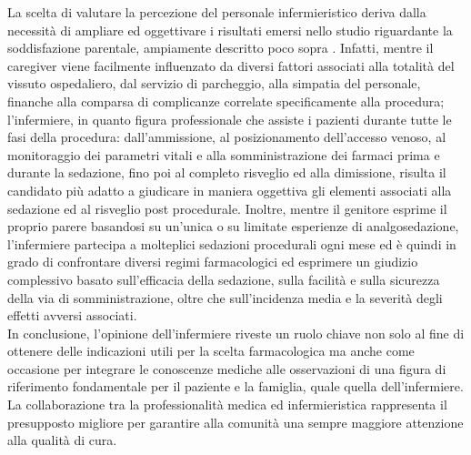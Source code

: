 La scelta di valutare la percezione del personale infermieristico deriva dalla necessità di ampliare ed oggettivare i risultati emersi nello studio riguardante la soddisfazione parentale, ampiamente descritto poco sopra \cite{Cortellazzo2022}. Infatti, mentre il caregiver viene facilmente influenzato da diversi fattori associati alla totalità del vissuto ospedaliero, dal servizio di parcheggio, alla simpatia del personale, finanche alla comparsa di complicanze correlate specificamente alla procedura; l'infermiere, in quanto figura professionale che assiste i pazienti durante tutte le fasi della procedura: dall'ammissione, al posizionamento dell'accesso venoso, al monitoraggio dei parametri vitali e alla somministrazione dei farmaci prima e durante la sedazione, fino poi al completo risveglio ed alla dimissione, risulta il candidato più adatto a giudicare in maniera oggettiva gli elementi associati alla sedazione ed al risveglio post procedurale. Inoltre, mentre il genitore esprime il proprio parere basandosi su un'unica o su limitate esperienze di analgosedazione, l'infermiere partecipa a molteplici sedazioni procedurali ogni mese ed è quindi in grado di confrontare diversi regimi farmacologici ed esprimere un giudizio complessivo basato sull'efficacia della sedazione, sulla facilità e sulla sicurezza della via di somministrazione, oltre che sull'incidenza media e la severità degli effetti avversi associati.
\\In conclusione, l'opinione dell'infermiere riveste un ruolo chiave non solo al fine di ottenere delle indicazioni utili per la scelta farmacologica ma anche come occasione per integrare le conoscenze mediche alle osservazioni di una figura di riferimento fondamentale per il paziente e la famiglia, quale quella dell'infermiere. La collaborazione tra la professionalità medica ed infermieristica rappresenta il presupposto migliore per garantire alla comunità una sempre maggiore attenzione alla qualità di cura. 


